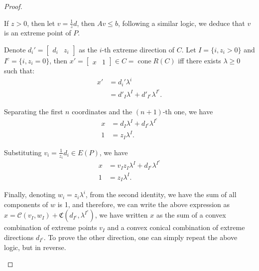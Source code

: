 \begin{proof}
\begin{itemize}
    If \( z > 0 \), then let \( v = \frac{1}{z} d \), then \( Av \le  b \),
    following a similar logic, we deduce that \( v \) is an extreme point of \(
    P\).

    Denote \( d_{i}' = \begin{bmatrix} d_{i} & z_{i} \end{bmatrix}  \) as
    the \( i \)-th extreme direction of \( C \). Let \( I = \{i, z_{i} > 0\}
    \) and \( I^{c} = \{i, z_{i}  = 0\}   \),
    then \( x' = \begin{bmatrix} x
    & 1\end{bmatrix}  \in C =
    \operatorname{cone} R(C) \) iff there exists \( \lambda \ge 0 \) such that:
    \begin{align*}
      x' &= d_{i}'\lambda^{i}\\
      &= d'_{I}\lambda^{I} + d'_{I^{c}}\lambda^{I^{c}}
    .\end{align*}

    Separating the first \( n \) coordinates and the \( (n+1) \)-th one, we have
    \begin{align*}
      x &= d_{I}\lambda^{I} + d_{I^{c}}\lambda^{I^{c}} \\
      1 &= z_{I}\lambda^{I}
    .\end{align*}

    Substituting \( v_{i} = \frac{1}{z_{i}}d_{i} \in E(P) \), we have
    \begin{align*}
      x &= v_{I}z_{I}\lambda^{I} + d_{I^{c}}\lambda^{I^{c}}\\
      1 &= z_{I}\lambda^{I}
    .\end{align*}

    Finally, denoting \( w_{i} = z_{i}\lambda^{i} \), from the second identity,
    we have the sum of all components of \( w \) is 1, and therefore, we can
    write the above
    expression as \( x = \mathcal{C}(v_{I}, w_{I}) + \mathfrak{C}(d_{I^{c}},
    \lambda^{I^{c}}) \), we have written \( x \) as the sum of a convex
    combination of extreme points \( v_{I} \) and a convex conical combination
    of extreme directions \( d_{I^{c}} \). To prove the other direction, one
    can simply repeat the above logic, but in reverse.


\end{itemize}
\end{proof}
